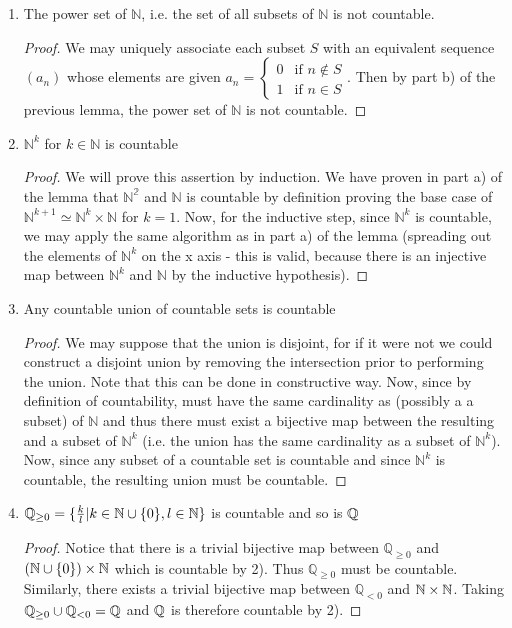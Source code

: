 \begin{cor}
\begin{enumerate}[start=0]
\item The power set of $\mathbb{N}$, i.e. the set of all subsets of $\mathbb{N}$ is not countable.
\begin{proof}
We may uniquely associate each subset $S$ with an equivalent sequence $(a_n)$ whose elements are given $a_n=\begin{cases} 0 &\mbox{if } n\not\in S \\ 1 & \mbox{if }  n \in S \end{cases}$. Then by part b) of the previous lemma, the power set of $\mathbb{N}$ is not countable.
\end{proof}
\item $\mathbb{N}^k$ for $k\in\mathbb{N}$ is countable
\begin{proof}
We will prove this assertion by induction. We have proven in part a) of the lemma that $\mathbb{N^2}$ and $\mathbb{N}$ is countable by definition proving the base case of $\mathbb{N}^{k+1}\simeq\mathbb{N}^k\times \mathbb{N}$ for $k=1$. Now, for the inductive step, since $\mathbb{N}^k$ is countable, we may apply the same algorithm as in part a) of the lemma (spreading out the elements of $\mathbb{N}^k$ on the x axis - this is valid, because there is an injective map between $\mathbb{N}^k$ and $\mathbb{N}$ by the inductive hypothesis).
\end{proof}
\item Any countable union of countable sets is countable
\begin{proof}
We may suppose that the union is disjoint, for if it were not we could construct a disjoint union by removing the intersection prior to performing the union. Note that this can be done in constructive way. Now, since by definition of countability, must have the same cardinality as (possibly a a subset) of $\mathbb{N}$ and thus there must exist a bijective map between the resulting and a subset of $\mathbb{N}^k$ (i.e. the union has the same cardinality as a subset of $\mathbb{N}^k$). Now, since any subset of a countable set is countable and since $\mathbb{N}^k$ is countable, the resulting union must be countable.
\end{proof}
\item $\mathbb{Q}_{\geq 0} = \{\frac{k}{l} | k\in \mathbb{N}\cup\{0\}, l\in\mathbb{N}\}$ is countable and so is $\mathbb{Q}$
\begin{proof}
Notice that there is a trivial bijective map between $\mathbb{Q}_{\geq 0}$ and $(\mathbb{N}\cup\{0\})\times\mathbb{N}$ which is countable by 2). Thus $\mathbb{Q}_{\geq 0}$ must be countable. Similarly, there exists a trivial bijective map between $\mathbb{Q}_{<0}$ and $\mathbb{N}\times\mathbb{N}$. Taking $\mathbb{Q}_{\geq 0}\cup\mathbb{Q}_{<0}=\mathbb{Q}$ and $\mathbb{Q}$ is therefore countable by 2).

\end{proof}
\end{enumerate}
\end{cor}
